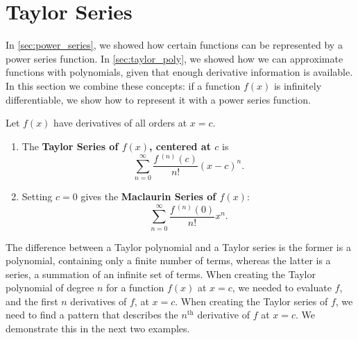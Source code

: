 \section{Taylor Series}\label{sec:taylor_series}

In \autoref{sec:power_series}, we showed how certain functions can be represented by a power series function. In \autoref{sec:taylor_poly}, we showed how we can approximate functions with polynomials, given that enough derivative information is available. In this section we combine these concepts: if a function $f(x)$ is infinitely differentiable, we show how to represent it with a power series function.

\begin{definition}\label{def:taylor_series}%
Let $f(x)$ have derivatives of all orders at $x=c$.
\begin{enumerate}
	\item The \textbf{Taylor Series of $f(x)$, centered at $c$} is
	\[\sum_{n=0}^\infty \frac{f\,^{(n)}(c)}{n!}(x-c)^n.\]
	\item	Setting $c=0$ gives the \textbf{Maclaurin Series of $f(x)$}:
	\[\sum_{n=0}^\infty \frac{f\,^{(n)}(0)}{n!}x^n.\]
\end{enumerate}
\end{definition}


The difference between a Taylor polynomial and a Taylor series is the former is a polynomial, containing only a finite number of terms, whereas the latter is a series, a summation of an infinite set of terms. When creating the Taylor polynomial of degree $n$ for a function $f(x)$ at $x=c$, we needed to evaluate $f$, and the first $n$ derivatives of $f$, at $x=c$. When creating the Taylor series of $f$, we need to find a pattern that describes the $n^\text{th}$ derivative of $f$ at $x=c$. We demonstrate this in the next two examples.

